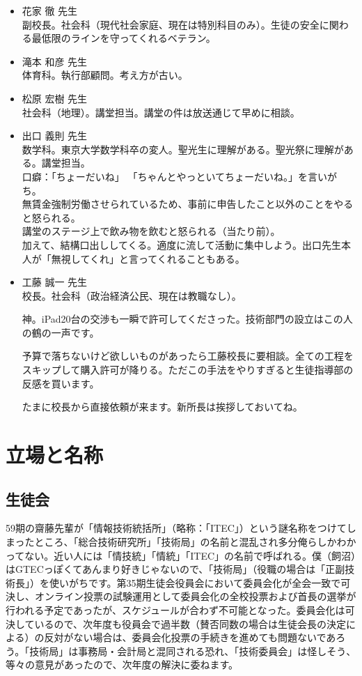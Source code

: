 \documentclass[a4paper]{ltjsreport}
\begin{document}
\begin{itemize}
  \item 花家 徹 先生\\
        副校長。社会科（現代社会家庭、現在は特別科目のみ）。生徒の安全に関わる最低限のラインを守ってくれるベテラン。

  \item 滝本 和彦 先生\\
        体育科。執行部顧問。考え方が古い。

  \item 松原 宏樹 先生\\
        社会科（地理）。講堂担当。講堂の件は放送通じて早めに相談。

  \item 出口 義則 先生\\
        数学科。東京大学数学科卒の変人。聖光生に理解がある。聖光祭に理解がある。講堂担当。
        \\口癖：「ちょーだいね」
        「ちゃんとやっといてちょーだいね。」を言いがち。\\
        無賃金強制労働させられているため、事前に申告したこと以外のことをやると怒られる。\\
        講堂のステージ上で飲み物を飲むと怒られる（当たり前）。\\
        加えて、結構口出ししてくる。適度に流して活動に集中しよう。出口先生本人が「無視してくれ」と言ってくれることもある。

  \item 工藤 誠一 先生\\
        校長。社会科（政治経済公民、現在は教職なし）。

        神。iPad20台の交渉も一瞬で許可してくださった。技術部門の設立はこの人の鶴の一声です。

        予算で落ちないけど欲しいものがあったら工藤校長に要相談。全ての工程をスキップして購入許可が降りる。ただこの手法をやりすぎると生徒指導部の反感を買います。

        たまに校長から直接依頼が来ます。新所長は挨拶しておいてね。
\end{itemize}

\section{立場と名称}
\subsection{生徒会}
59期の齋藤先輩が「情報技術統括所」（略称：「ITEC」）という謎名称をつけてしまったところ、「総合技術研究所」「技術局」の名前と混乱され多分俺らしかわかってない。近い人には「情技統」「情統」「ITEC」の名前で呼ばれる。僕（飼沼）はGTECっぽくてあんまり好きじゃないので、「技術局」（役職の場合は「正副技術長」）を使いがちです。第35期生徒会役員会において委員会化が全会一致で可決し、オンライン投票の試験運用として委員会化の全校投票および首長の選挙が行われる予定であったが、スケジュールが合わず不可能となった。委員会化は可決しているので、次年度も役員会で過半数（賛否同数の場合は生徒会長の決定による）の反対がない場合は、委員会化投票の手続きを進めても問題ないであろう。「技術局」は事務局・会計局と混同される恐れ、「技術委員会」は怪しそう、等々の意見があったので、次年度の解決に委ねます。
\end{document}
